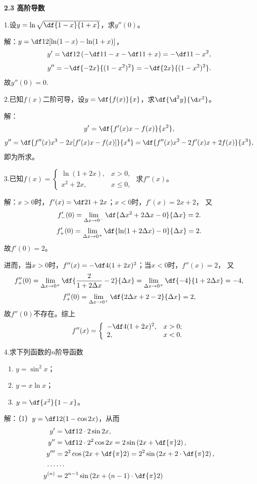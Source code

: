 \begin{center}
	\bf 2.3 高阶导数
\end{center}

\bigskip

1.设$y=\ln\sqrt{\df{1-x}{1+x}}$，求$y''(0)$。

解：$y=\df12[\ln(1-x)-\ln(1+x)]$，
$$y'=\df12\left(-\df1{1-x}-\df1{1+x}\right)
=-\df1{1-x^2},$$
$$y''=-\df{-2x}{(1-x^2)^2}=-\df{2x}{(1-x^2)^2}.$$
故$y''(0)=0$.\fin

\bigskip

2.已知$f(x)$二阶可导，设$y=\df{f(x)}{x}$，求$\df{\d^2y}{\d x^2}$。

解：
$$y'=\df{f'(x)x-f(x)}{x^2},$$
$$y''=\df{f''(x)x^3-2x[f'(x)x-f(x)]}{x^4}=\df{f''(x)x^2-2f'(x)x+2f(x)}{x^3},$$
即为所求。\fin

\bigskip

3.已知$f(x)=\left\{\begin{array}{ll}
  	\ln(1+2x),& x>0, \\ x^2+2x, & x\leq 0,
  \end{array}\right.$
求$f''(x)$。

解：$x>0$时，$f'(x)=\df2{1+2x}$；$x<0$时，$f'(x)=2x+2$，
又
$$f'_-(0)=\lim\limits_{\Delta x\to0^-}\df{\Delta x^2+2\Delta x-0}{\Delta x}=2.$$
$$f'_+(0)=\lim\limits_{\Delta x\to0^+}\df{\ln(1+2\Delta x)-0}{\Delta x}=2.$$
故$f'(0)=2$。

进而，当$x>0$时，$f''(x)=-\df4{(1+2x)^2}$；当$x<0$时，$f''(x)=2$，
又
$$f''_+(0)=\lim\limits_{\Delta x\to0^+}
\df{\frac2{1+2\Delta x}-2}{\Delta x}
=\lim\limits_{\Delta x\to0^+}
\df{-4}{1+2\Delta x}=-4,$$
$$f''_+(0)=\lim\limits_{\Delta x\to0^+}
\df{2\Delta x+2-2}{\Delta x}=2,
$$
故$f''(0)$不存在。综上
$$f''(x)=\left\{\begin{array}{ll}
	-\df4{(1+2x)^2}, & x>0;\\
	2, & x<0.
\end{array}\right.$$
\fin

\bigskip

4.求下列函数的$n$阶导函数
  \begin{enumerate}[(1)]
    \setlength{\itemindent}{1cm}
    \item $y=\sin^2x$；
    \item $y=x\ln x$；
    \item $y=\df{x^2}{1-x}$。
  \end{enumerate}
  
解：（1）$y=\df12(1-\cos2x)$，从而
\begin{align*}
	y'&=\df12\cdot 2\sin2x,\\
	y''&=\df12\cdot 2^2\cos2x=2\sin\left(2x+\df{\pi}2\right),\\
	y'''&=2^2\cos\left(2x+\df{\pi}2\right)=2^2\sin\left(2x+2\cdot\df{\pi}2\right),\\
	\ldots&\ldots\\
	y^{(n)}&=2^{n-1}\sin\left(2x+(n-1)\cdot\df{\pi}2\right)
\end{align*}

